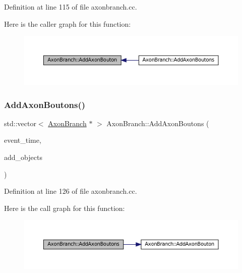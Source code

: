 Definition at line 115 of file axonbranch.\+cc.

Here is the caller graph for this function\+:\nopagebreak
\begin{figure}[H]
\begin{center}
\leavevmode
\includegraphics[width=350pt]{class_axon_branch_a88e6af84b45bb6f6f8900a6d4aec446c_icgraph}
\end{center}
\end{figure}
\mbox{\label{class_axon_branch_a788ca8cc7e6f60f07b9e19a8e3022b64}} 
\subsubsection{\texorpdfstring{Add\+Axon\+Boutons()}{AddAxonBoutons()}}
{\footnotesize\ttfamily std\+::vector$<$ \mbox{\hyperlink{class_axon_branch}{Axon\+Branch}} $\ast$ $>$ Axon\+Branch\+::\+Add\+Axon\+Boutons (\begin{DoxyParamCaption}\item[{std\+::chrono\+::time\+\_\+point$<$ \mbox{\hyperlink{universe_8h_a0ef8d951d1ca5ab3cfaf7ab4c7a6fd80}{Clock}} $>$}]{event\+\_\+time,  }\item[{std\+::vector$<$ \mbox{\hyperlink{class_axon_branch}{Axon\+Branch}} $\ast$$>$}]{add\+\_\+objects }\end{DoxyParamCaption})}



Definition at line 126 of file axonbranch.\+cc.

Here is the call graph for this function\+:\nopagebreak
\begin{figure}[H]
\begin{center}
\leavevmode
\includegraphics[width=350pt]{class_axon_branch_a788ca8cc7e6f60f07b9e19a8e3022b64_cgraph}
\end{center}
\end{figure}
\mbox{\label{class_axon_branch_ae861207a8a0aeb2b60c305b25248e4b9}} 

